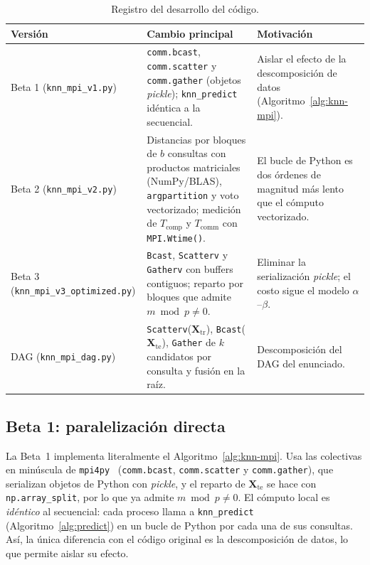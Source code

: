 \documentclass[11pt,a4paper]{article}
\newcommand{\mte}{m}   %
\newcommand{\Xtr}{\mathbf{X}_{\text{tr}}}
\newcommand{\Xte}{\mathbf{X}_{\text{te}}}
\newcommand{\Tcomp}{T_{\text{comp}}}
\newcommand{\Tcomm}{T_{\text{comm}}}
\begin{document}
\begin{table}[H]
\centering
\caption{Registro del desarrollo del código.}
\label{tab:versiones-desc}
\small
\begin{tabularx}{\textwidth}{l>{\raggedright\arraybackslash}X>{\raggedright\arraybackslash}X}
\toprule
Versión & Cambio principal & Motivación\\
\midrule
Beta 1 (\texttt{knn\_mpi\_v1.py}) & \texttt{comm.bcast}, \texttt{comm.scatter} y
  \texttt{comm.gather} (objetos \emph{pickle}); \texttt{knn\_predict} idéntica a la secuencial. &
  Aislar el efecto de la descomposición de datos (Algoritmo~\ref{alg:knn-mpi}).\\
Beta 2 (\texttt{knn\_mpi\_v2.py}) & Distancias por bloques de $b$ consultas con productos
  matriciales (NumPy/BLAS), \texttt{argpartition} y voto vectorizado; medición de $\Tcomp$ y
  $\Tcomm$ con \texttt{MPI.Wtime()}. & El bucle de Python es dos órdenes de magnitud más lento que
  el cómputo vectorizado.\\
Beta 3 (\texttt{knn\_mpi\_v3\_optimized.py}) & \texttt{Bcast}, \texttt{Scatterv} y
  \texttt{Gatherv} con buffers contiguos; reparto por bloques que admite $\mte\bmod p\neq0$. &
  Eliminar la serialización \emph{pickle}; el costo sigue el modelo $\alpha$--$\beta$.\\
DAG (\texttt{knn\_mpi\_dag.py}) & \texttt{Scatterv}($\Xtr$), \texttt{Bcast}($\Xte$),
  \texttt{Gather} de $k$ candidatos por consulta y fusión en la raíz. & Descomposición del DAG del
  enunciado.\\
\bottomrule
\end{tabularx}
\end{table}

\subsection{Beta 1: paralelización directa}
La Beta~1 implementa literalmente el Algoritmo~\ref{alg:knn-mpi}. Usa las colectivas en minúscula
de \texttt{mpi4py}~\cite{mpi4pydoc} (\texttt{comm.bcast}, \texttt{comm.scatter} y
\texttt{comm.gather}), que serializan objetos de Python con \emph{pickle}, y el reparto de $\Xte$ se
hace con \texttt{np.array\_split}, por lo que ya admite $\mte\bmod p\neq0$. El cómputo local es
\emph{idéntico} al secuencial: cada proceso llama a \texttt{knn\_predict} (Algoritmo~\ref{alg:predict})
en un bucle de Python por cada una de sus consultas. Así, la única diferencia con el código original
es la descomposición de datos, lo que permite aislar su efecto.
\end{document}
